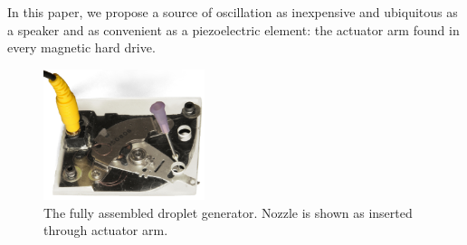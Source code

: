 \documentclass[aip,rsi,reprint,graphicx]{revtex4-1} %
\begin{document}
In this paper, we propose a source of oscillation as inexpensive and ubiquitous
as a speaker and as convenient as a piezoelectric element: the actuator arm
found in every magnetic hard drive.
\begin{figure}
\centering
\includegraphics[width=0.42\textwidth]{hdg_images/designpicture.jpg}
\caption{The fully assembled droplet generator. Nozzle is shown as inserted
through actuator arm. \label{fig:photo}}
\end{figure}

%

\end{document}
